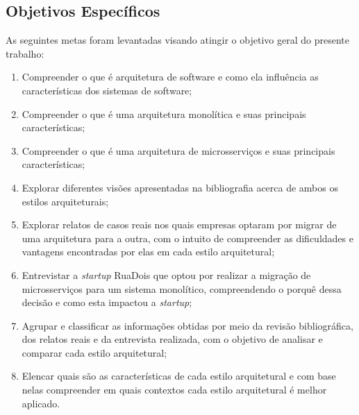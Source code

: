 \subsection{Objetivos Específicos}

As seguintes metas foram levantadas visando atingir o objetivo geral do presente
trabalho:

  \begin{enumerate}
      \item Compreender o que é arquitetura de software e como ela influência as características dos
          sistemas de software;
      \item Compreender o que é uma arquitetura monolítica e suas principais características;
      \item Compreender o que é uma arquitetura de microsserviços e suas principais características;
      \item Explorar diferentes visões apresentadas na bibliografia acerca de ambos os estilos
          arquiteturais;
      \item Explorar relatos de casos reais nos quais empresas optaram por migrar de uma arquitetura
          para a outra, com o intuito de compreender as dificuldades e vantagens encontradas por
          elas em cada estilo arquitetural;
      \item Entrevistar a \textit{startup} RuaDois que optou por realizar a migração de
          microsserviços para um sistema monolítico, compreendendo o porquê dessa decisão e como
          esta impactou a \textit{startup};
      \item Agrupar e classificar as informações obtidas por meio da revisão bibliográfica, dos
          relatos reais e da entrevista realizada, com o objetivo de analisar e comparar cada estilo
          arquitetural;
      \item Elencar quais são as características de cada estilo arquitetural e com base nelas
          compreender em quais contextos cada estilo arquitetural é melhor aplicado.
  \end{enumerate}
